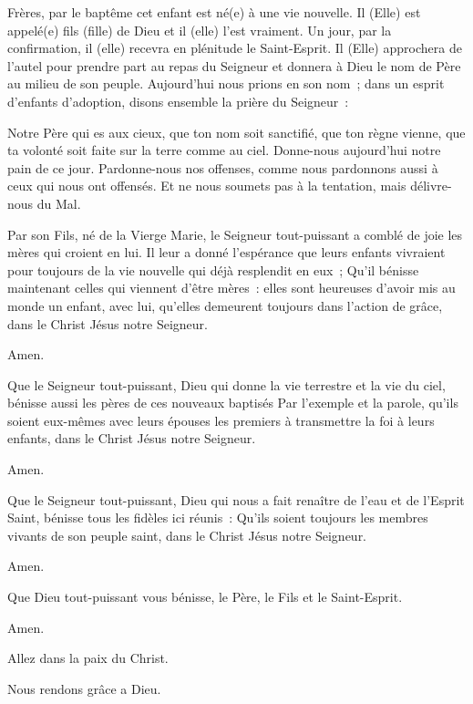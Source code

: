 \pars{}


Frères, par le baptême cet enfant est né(e) à une vie nouvelle.
Il (Elle) est appelé(e) fils (fille) de Dieu et il (elle) l'est vraiment.
Un jour, par la confirmation, il (elle) recevra en plénitude le Saint-Esprit.
Il (Elle) approchera de l'autel pour prendre part au repas du Seigneur
et donnera à Dieu le nom de Père au milieu de son peuple.
Aujourd'hui nous prions en son nom~; dans un esprit d'enfants d'adoption,
disons ensemble la prière du Seigneur~:

Notre Père qui es aux cieux,
que ton nom soit sanctifié,
que ton règne vienne,
que ta volonté soit faite sur la terre comme au ciel.
Donne-nous aujourd'hui notre pain de ce jour.
Pardonne-nous nos offenses,
comme nous pardonnons aussi à ceux qui nous ont offensés.
Et ne nous soumets pas à la tentation,
mais délivre-nous du Mal.

\pars{}


Par son Fils, né de la Vierge Marie, le Seigneur tout-puissant
a comblé de joie les mères qui croient en lui. Il leur a donné l'espérance
que leurs enfants vivraient pour toujours de la vie nouvelle qui déjà
resplendit en eux~; Qu'il bénisse maintenant celles qui viennent d'être
mères~: elles sont heureuses d'avoir mis au monde un enfant, avec lui,
qu'elles demeurent toujours dans l'action de grâce, dans le Christ Jésus
notre Seigneur.

 Amen.

 Que le Seigneur tout-puissant, Dieu qui donne
la vie terrestre et la vie du ciel, bénisse aussi les pères de ces nouveaux
baptisés Par l'exemple et la parole, qu'ils soient eux-mêmes avec leurs
épouses les premiers à transmettre la foi à leurs enfants, dans le Christ
Jésus notre Seigneur.

 Amen.

 Que le Seigneur tout-puissant, Dieu qui nous a fait
renaître de l'eau et de l'Esprit Saint, bénisse tous les fidèles ici réunis~:
Qu'ils soient toujours les membres vivants de son peuple saint, dans le
Christ Jésus notre Seigneur.

 Amen.

 Que Dieu tout-puissant vous bénisse,
le Père, le Fils \grecross{} et le Saint-Esprit.

 Amen.

 Allez dans la paix du Christ.

 Nous rendons grâce a Dieu.
